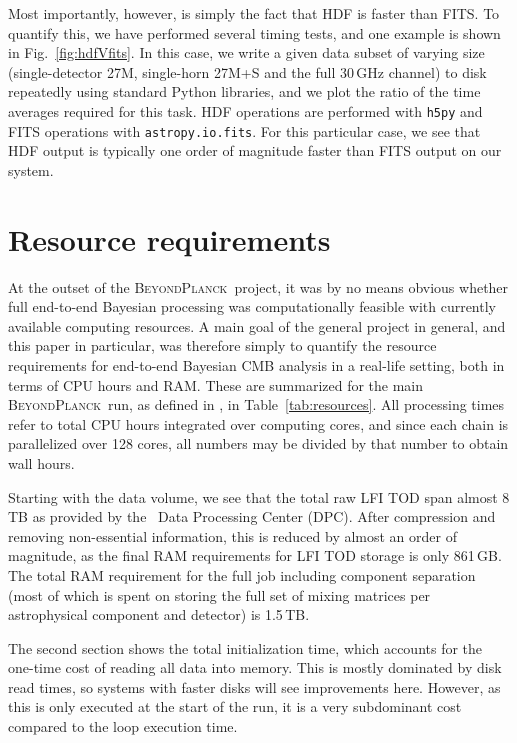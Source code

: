 \documentclass[twocolumn]{aa}
\newcommand{\BP}{\textsc{BeyondPlanck}}
\begin{document}
Most importantly, however, is simply the fact that HDF is faster than
FITS. To quantify this, we have performed several timing tests, and
one example is shown in Fig.~\ref{fig:hdfVfits}. In this case, we
write a given data subset of varying size (single-detector 27M,
single-horn 27M+S and the full 30\,GHz channel) to disk repeatedly
using standard Python libraries, and we plot the ratio of the time
averages required for this task. HDF operations are performed with
\texttt{h5py} and FITS operations with \texttt{astropy.io.fits}. For
this particular case, we see that HDF output is typically one order of
magnitude faster than FITS output on our system.

\section{Resource requirements}

At the outset of the \BP\ project, it was by no means obvious whether
full end-to-end Bayesian processing was computationally feasible with
currently available computing resources. A main goal of the general
project in general, and this paper in particular, was therefore simply
to quantify the resource requirements for end-to-end Bayesian CMB
analysis in a real-life setting, both in terms of CPU hours and
RAM. These are summarized for the main \BP\ run, as defined in
\citet{BP01}, in Table~\ref{tab:resources}. All processing times refer
to total CPU hours integrated over computing cores, and since each
chain is parallelized over 128 cores, all numbers may be divided by
that number to obtain wall hours.

Starting with the data volume, we see that the total raw LFI TOD span
almost 8\,TB as provided by the \Planck\ Data Processing Center
(DPC). After compression and removing
non-essential information, this is reduced by almost an order of
magnitude, as the final RAM requirements for LFI TOD storage is only
861\,GB. The total RAM requirement for the full job including
component separation (most of which is spent on storing the full set
of mixing matrices per astrophysical component and detector) is
1.5\,TB.

The second section shows the total initialization time, which accounts
for the one-time cost of reading all data into memory. This is
mostly dominated by disk read times, so systems with faster disks will
see improvements here. However, as this is only executed at the start
of the run, it is a very subdominant cost compared to the loop
execution time.
\end{document}
